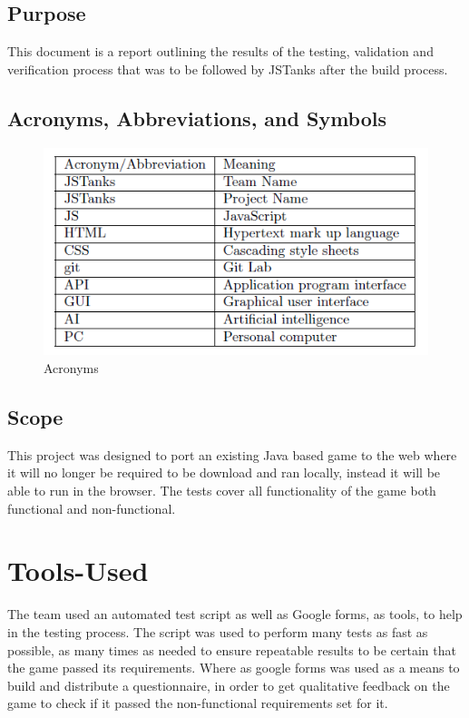 \documentclass{article}
\begin{document}
\subsection{Purpose}
This document is a report outlining the results of the testing, validation and verification process 
that was to be followed by JSTanks after the build process. 



\subsection{Acronyms, Abbreviations, and Symbols}
\begin{figure}[H]
	\centering
	\includegraphics[width=\textwidth]{./Figures/fig1.png}
	\caption{Acronyms}
\end{figure}

\subsection{Scope}
This project was designed to port an existing Java based game to the web
where it will no longer be required to be download and ran locally, instead
it will be able to run in the browser. The tests cover all functionality of the 
game both functional and non-functional.

\section{Tools-Used}
The team used an automated test script as well as Google forms, as tools,
to help in the testing process. The script was used to perform many tests
as fast as possible, as many times as needed to ensure repeatable results
to be certain that the game passed its requirements. Where as google forms
was used as a means to build and distribute a questionnaire, in order to get 
qualitative feedback on the game to check if it passed the non-functional 
requirements set for it.
\end{document}
